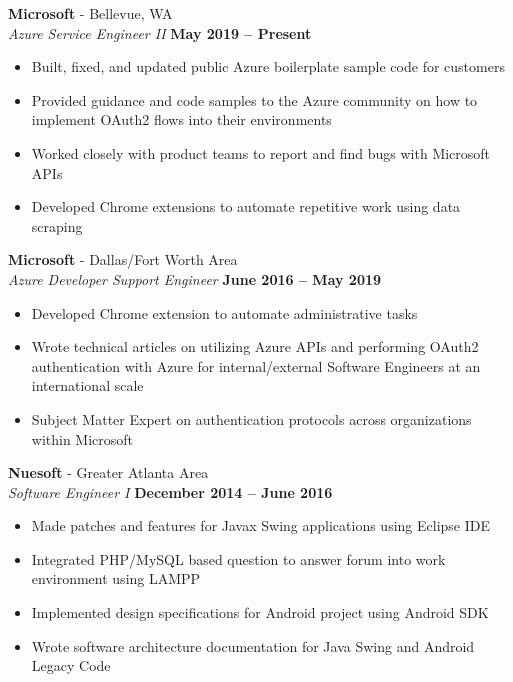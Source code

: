 \documentclass[margin,line]{resume}
\begin{document}
\begin{resume}
	\textbf{Microsoft} - Bellevue, WA \vspace{1mm}\\\vspace{1mm}
	\textsl{Azure Service Engineer II} \hfill \textbf{May 2019 -- Present}
	\begin{itemize}
		\item Built, fixed, and updated public Azure boilerplate sample code for customers
		\item Provided guidance and code samples to the Azure community on how to implement OAuth2 flows into their environments
		\item Worked closely with product teams to report and find bugs with Microsoft APIs
		\item Developed Chrome extensions to automate repetitive work using data scraping
	\end{itemize}
		
	\textbf{Microsoft} - Dallas/Fort Worth Area\vspace{1mm}\\\vspace{1mm}
	\textsl{Azure Developer Support Engineer} \hfill \textbf{June 2016 -- May 2019}
	\begin{itemize}
		 \item Developed Chrome extension to automate administrative tasks
		 \item Wrote technical articles on utilizing Azure APIs and performing OAuth2 authentication with Azure for internal/external Software Engineers at an international scale
		 \item Subject Matter Expert on authentication protocols across organizations within Microsoft
	
	\end{itemize}

	\textbf{Nuesoft} - Greater Atlanta Area \vspace{1mm}\\\vspace{1mm}%
	\textsl{Software Engineer I} \hfill \textbf{December 2014 -- June 2016}
	\begin{itemize}
	 	\item Made patches and features for Javax Swing applications using Eclipse IDE 
	 	\item Integrated PHP/MySQL based question to answer forum into work environment using LAMPP
	 	\item Implemented design specifications for Android project using Android SDK
	 	\item Wrote software architecture documentation for Java Swing and Android Legacy Code 
	\end{itemize}


\end{resume}
\end{document}
